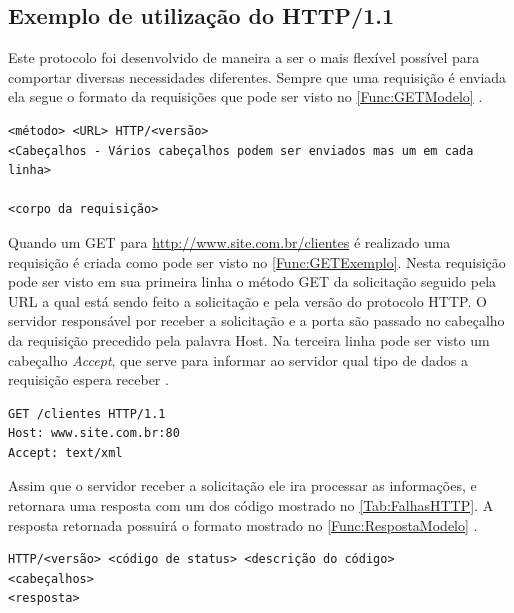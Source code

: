 \subsection{Exemplo de utilização do HTTP/1.1} \label{subsec:ExemploHttp}

Este protocolo foi desenvolvido de maneira a ser o mais flexível possível para comportar diversas necessidades diferentes.
Sempre que uma requisição é enviada ela segue o formato da requisições que pode ser visto no \autoref{Func:GETModelo} \cite{Saudate:2014}.

\begin{lstlisting}[label=Func:GETModelo,caption={[Formato de uma requisição HTTP]Formato de uma requisição HTTP}]
<método> <URL> HTTP/<versão>
<Cabeçalhos - Vários cabeçalhos podem ser enviados mas um em cada linha>

<corpo da requisição> 
\end{lstlisting}


Quando um GET para \url{http://www.site.com.br/clientes} é realizado uma requisição é criada como pode ser visto no \autoref{Func:GETExemplo}. Nesta requisição pode ser visto em sua primeira linha o método GET da solicitação seguido pela URL a qual está sendo feito a solicitação e pela versão do protocolo HTTP. O servidor responsável por receber a solicitação e a porta são passado no cabeçalho da requisição precedido pela palavra Host. Na terceira linha pode ser visto um cabeçalho \textit{Accept}, que serve para informar ao servidor qual tipo de dados a requisição espera receber \cite{Saudate:2014}.


\begin{lstlisting}[label=Func:GETExemplo,caption={[Exemplo de uma requisição HTTP utilizando o método GET.]Exemplo de uma solicitação HTTP utilizando o método GET, para \url{http://www.site.com.br/clientes} com o pedido de uma arquivo XML de resposta.}]
GET /clientes HTTP/1.1
Host: www.site.com.br:80
Accept: text/xml
\end{lstlisting}

Assim que o servidor receber a solicitação ele ira processar as informações, e retornara uma resposta com um dos código mostrado no \autoref{Tab:FalhasHTTP}. A resposta retornada possuirá o formato mostrado no \autoref{Func:RespostaModelo} \cite{Saudate:2014}.


\begin{lstlisting}[label=Func:RespostaModelo,caption={[Formato de uma resposta HTTP]Formato de uma resposta HTTP}]
HTTP/<versão> <código de status> <descrição do código>
<cabeçalhos>
<resposta>
\end{lstlisting}


